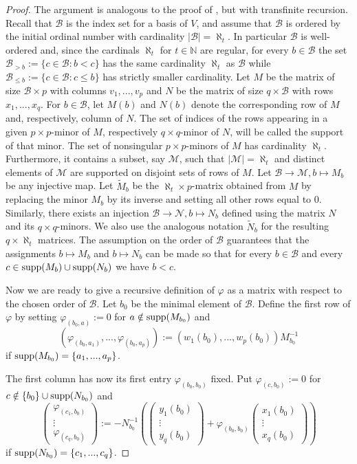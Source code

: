 \documentclass[12pt]{article}
\def\NN {{\mathbb N}}     %
\def\B  {\mathcal B}
\def\mc {\mathcal}
\begin{document}
\begin{proof}
The argument is analogous to the proof of \cite[Lemma~4.2]{Chirvasitu-Penkov-OTC}, but with transfinite recursion. Recall that $\B$ is the index set for a basis of $V$, and assume that $\B$ is ordered by the initial ordinal number with cardinality $|\B|=\aleph_t$. In particular $\B$ is well-ordered and, since the cardinals $\aleph_t$ for $t\in\NN$ are regular, for every $b\in \B$ the set $\B_{>b}:=\{c\in\B:b<c\}$ has the same cardinality $\aleph_t$ as $\B$ while $\B_{\leq b}:=\{c\in\B:c\leq b\}$ has strictly smaller cardinality. Let $M$ be the matrix of size $\B\times p$ with columns $v_1,...,v_p$ and $N$ be the matrix of size $q\times \B$ with rows $x_1,...,x_q$. For $b\in\B$, let $M(b)$ and $N(b)$ denote the corresponding row of $M$ and, respectively, column of $N$. The set of indices of the rows appearing in a given $p\times p$-minor of $M$, respectively $q\times q$-minor of $N$, will be called the support of that minor. The set of nonsingular $p\times p$-minors of $M$ has cardinality $\aleph_t$. Furthermore, it contains a subset, say $\mc M$, such that $|\mc M|=\aleph_t$ and distinct elements of $\mc M$ are supported on disjoint sets of rows of $M$. Let $\B\to\mc M, b\mapsto M_b$ be any injective map. Let $\tilde M_b$ be the $\aleph_t\times p$-matrix obtained from $M$ by replacing the minor $M_b$ by its inverse and setting all other rows equal to $0$. Similarly, there exists an injection $\mc B\to\mc N, b\mapsto N_b$ defined using the matrix $N$ and its $q\times q$-minors. We also use the analogous notation $\tilde N_b$ for the resulting $q\times \aleph_t$ matrices. The assumption on the order of $\B$ guarantees that the assignments $b\mapsto M_b$ and $b\mapsto N_b$ can be made so that for every $b\in\B$ and every $c\in {\rm supp}(M_b)\cup{\rm supp}(N_b)$ we have $b<c$.

Now we are ready to give a recursive definition of $\varphi$ as a matrix with respect to the chosen order of $\B$. Let $b_0$ be the minimal element of $\B$. Define the first row of $\varphi$ by setting $\varphi_{(b_0,a)}:=0$ for $a\notin{\rm supp}(M_{b_0})$ and 
$$
(\varphi_{(b_0,a_1)},...,\varphi_{(b_0,a_p)}) := (w_1(b_0),...,w_p(b_0))M_{b_0}^{-1}
$$
if ${\rm supp}(M_{b_0})=\{a_1,...,a_p\}$.

The first column has now its first entry $\varphi_{(b_0,b_0)}$ fixed. Put $\varphi_{(c,b_0)}:=0$ for $c\notin \{b_0\}\cup{\rm supp}(N_{b_0})$ and
$$
\begin{pmatrix} \varphi_{(c_1,b_0)}\\ \vdots\\ \varphi_{(c_q,b_0)}\end{pmatrix} :=-N_{b_0}^{-1}\left(\begin{pmatrix} y_1(b_0)\\ \vdots\\ y_q(b_0)\end{pmatrix}+ \varphi_{(b_0,b_0)} \begin{pmatrix} x_1(b_0)\\ \vdots\\ x_q(b_0)\end{pmatrix}\right) 
$$
if ${\rm supp}(N_{b_0})=\{c_1,...,c_q\}$.


\end{proof}
\end{document}
